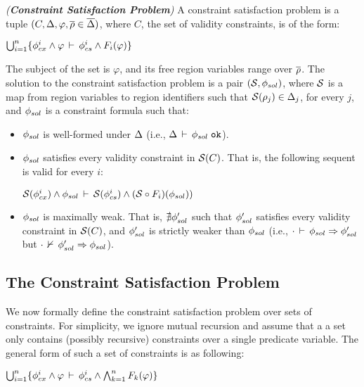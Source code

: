 \begin{definition}
\emph{(\textbf{Constraint Satisfaction Problem})}
A constraint satisfaction problem is a tuple
$(C,\Delta,\varphi,\overline{\rho} \in \overline{\Delta})$, where $C$, the set
of validity constraints, is of the form:
\begin{center}
\(
  \bigcup_{i=1}^n \{
    \phi_{cx}^{i} \wedge \varphi\,\vdash\,\phi_{cs}^{i} \wedge F_i(\varphi)
  \}
\)
\end{center}
The subject of the set is $\varphi$, and its free region variables
range over $\overline{\rho}$. The solution to the constraint satisfaction
problem is a pair $(\mathcal{S},\phi_{sol})$, where $\mathcal{S}$ is a map from
region variables to region identifiers such that $\mathcal{S}(\rho_j) \in
\Delta_j$, for every $j$, and $\phi_{sol}$ is a constraint formula such
that:
\begin{itemize}
\item $\phi_{sol}$ is well-formed under $\Delta$ (i.e.,
$\Delta\,\vdash\,\phi_{sol} \; \texttt{ok}$).
\item $\phi_{sol}$ satisfies every validity constraint in $\mathcal{S}(C)$.
That is, the following sequent is valid for every $i$:
\begin{center}
\(
  \mathcal{S}(\phi_{cx}^{i}) \wedge \phi_{sol}\,\vdash\,\mathcal{S}(\phi_{cs}^{i}) \wedge (\mathcal{S} \circ F_i)(\phi_{sol}))
\)
\end{center}
\item $\phi_{sol}$ is maximally weak. That is, $\nexists \phi_{sol}'$ such
that $\phi_{sol}'$ satisfies every validity constraint in $\mathcal{S}(C)$,
and $\phi_{sol}'$ is strictly weaker than $\phi_{sol}$ (i.e.,
$\cdot\,\vdash\,\phi_{sol} \Rightarrow \phi_{sol}'$ but
$\cdot\,\nvdash\,\phi_{sol}' \Rightarrow \phi_{sol}$).
\end{itemize}
\end{definition}


\subsection{The Constraint Satisfaction Problem}

We now formally define the constraint satisfaction problem over sets
of constraints. For simplicity, we ignore mutual recursion and assume
that a a set only contains (possibly recursive) constraints over a
single predicate variable. The general form of such a set of
constraints is as following:
\begin{center}
\(
  \bigcup_{i=1}^n \{
    \phi_{cx}^{i} \wedge \varphi\,\vdash\,\phi_{cs}^{i} \wedge \bigwedge_{k=1}^n F_k(\varphi)
  \}
\)
\end{center}

